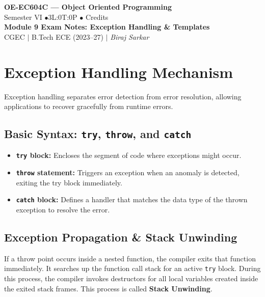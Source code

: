 \documentclass[12pt,a4paper]{article}
\begin{document}

\begin{center}
  {\LARGE\bfseries\color{myred} OE-EC604C --- Object Oriented Programming}\\[5pt]
  {\normalsize\color{mydark} Semester VI \quad$\bullet$\quad 3L:0T:0P \quad$\bullet$ Credits}\\[3pt]
  {\normalsize\color{myteal}\textbf{Module 9 Exam Notes: Exception Handling \& Templates}}\\[3pt]
  {\small\color{mydark} CGEC \;$|$\; B.Tech ECE (2023--27) \;$|$\; \textit{Biraj Sarkar}}
\end{center}
\vspace{2pt}
\noindent{\color{myred}\rule{\linewidth}{1.5pt}}
\vspace{2pt}

\hypersetup{linkcolor=mydark}
\tableofcontents
\hypersetup{linkcolor=myteal}
\newpage

\section{Exception Handling Mechanism}

Exception handling separates error detection from error resolution, allowing applications to recover gracefully from runtime errors.

\subsection{Basic Syntax: \texorpdfstring{\texttt{try}}{try}, \texorpdfstring{\texttt{throw}}{throw}, and \texorpdfstring{\texttt{catch}}{catch}}
\begin{itemize}[leftmargin=*, itemsep=3.5pt]
  \item \textbf{\texttt{try} block:} Encloses the segment of code where exceptions might occur.
  \item \textbf{\texttt{throw} statement:} Triggers an exception when an anomaly is detected, exiting the try block immediately.
  \item \textbf{\texttt{catch} block:} Defines a handler that matches the data type of the thrown exception to resolve the error.
\end{itemize}

\subsection{Exception Propagation \& Stack Unwinding}
If a throw point occurs inside a nested function, the compiler exits that function immediately. It searches up the function call stack for an active \texttt{try} block.
During this process, the compiler invokes destructors for all local variables created inside the exited stack frames. This process is called \textbf{Stack Unwinding}.
\end{document}
